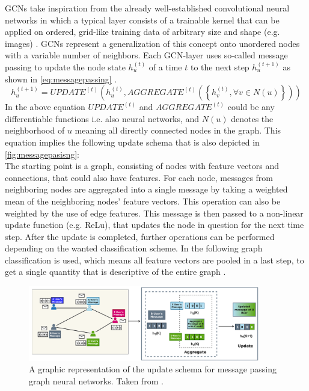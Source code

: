 \documentclass[11pt,a4paper]{article}
\begin{document}
GCNs take inspiration from the already well-established convolutional neural networks in which a typical layer consists of a trainable kernel that can be applied on ordered, grid-like training data of arbitrary size and shape (e.g. images) \cite{khemaniReviewGraphNeural2024}. 
GCNs represent a generalization of this concept onto unordered nodes with a variable number of neighbors. 
Each GCN-layer uses so-called message passing to update the node state $h^{(t)}_u$ of a time $t$ to the next step $h^{(t+1)}_u$ as shown in \autoref{eq:messagepassing} \cite[eq. 4.1]{khemaniReviewGraphNeural2024}.
\begin{equation}
h^{(t+1)}_u = UPDATE^{(t)}\left(h^{(t)}_u, AGGREGATE^{(t)}\left(\left\{h^{(t)}_v, \forall v \in N(u)\right\}\right)\right)
\label{eq:messagepassing}
\end{equation}
In the above equation $UPDATE^{(t)}$ and $AGGREGATE^{(t)}$ could be any differentiable functions i.e. also neural networks, and $N(u)$ denotes the neighborhood of $u$ meaning all directly connected nodes in the graph. 
This equation implies the following update schema that is also depicted in \autoref{fig:messagepasisng}: \\
The starting point is a graph, consisting of nodes with feature vectors and connections, that could also have features. 
For each node, messages from neighboring nodes are aggregated into a single message by taking a weighted mean of the neighboring nodes' feature vectors. 
This operation can also be weighted by the use of edge features. 
This message is then passed to a non-linear update function (e.g. ReLu), that updates the node in question for the next time step. 
After the update is completed, further operations can be performed depending on the wanted classification scheme. 
In the following graph classification is used, which means all feature vectors are pooled in a last step, to get a single quantity that is descriptive of the entire graph \cite{khemaniReviewGraphNeural2024}.
\begin{figure}[htbp]
\centering
\includegraphics[width=0.9\textwidth]{images/khemani7.png}
\caption{A graphic representation of the update schema for message passing graph neural networks. Taken from \cite[Fig. 7]{khemaniReviewGraphNeural2024}.}
\label{fig:messagepasisng}
\end{figure}
\end{document}
